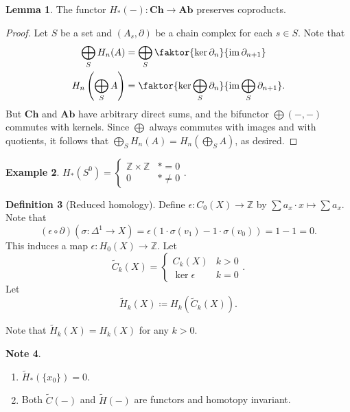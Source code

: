 \documentclass[10pt,letterpaper,cm]{nupset}
\theoremstyle{definition}
\newtheorem{definition}{Definition}[subsection]
\newtheorem{exmp}[definition]{Example}
\newtheorem{note}[definition]{Note}
\theoremstyle{theorem}
\newtheorem{lemma}[definition]{Lemma}
\theoremstyle{remark}
\newcommand{\Z}{\mathbb Z}
\newcommand{\1}{\mathbb{1}}
\newcommand{\0}{\vec 0}
\DeclareMathOperator{\im}{im}
\begin{document}
\begin{lemma}
The functor $H_{\ast}(-) : \mathbf{Ch} \to \mathbf{Ab}$ preserves coproducts. 
\end{lemma}
\begin{proof}
Let $S$ be a set and $(A_s, \partial)$ be a chain complex for each $s\in S$. Note that 
\begin{align*}
\bigoplus_S H_n(A) &= \bigoplus_S \faktor{\ker{\partial_n}}{\im{\partial_{n+1}}}
\\ H_n\left(\bigoplus_S A\right) &= \faktor{\ker{\bigoplus_S \partial_n}}{\im{\bigoplus_S \partial_{n+1}}}.
\end{align*} But $\mathbf{Ch}$ and $\mathbf{Ab}$ have arbitrary direct sums, and the bifunctor $\bigoplus (-,-)$ commutes with kernels. Since $\bigoplus$ always commutes with images and with quotients, it follows that $\bigoplus_S H_n(A) = H_n\left(\bigoplus_S A\right)$, as desired. 
\end{proof}


\begin{exmp}
$H_{\ast}(S^0) = \begin{cases} \Z \times \Z & \ast = 0 \\ 0 & \ast \ne 0 \end{cases}.$
\end{exmp}

\begin{definition}[Reduced homology]
Define $\epsilon :C_0(X) \to \Z$ by ${\sum {a_x \cdot x}} \mapsto \sum a_x$. Note that $$(\epsilon \circ \partial)(\sigma : \Delta^1 \to X) = \epsilon(1 \cdot \sigma(v_1) - 1 \cdot \sigma(v_0)) = 1-1 =0.$$ This induces a map $\epsilon : H_0(X) \to \Z$. Let $$\widetilde{C}_k(X) = \begin{cases} C_k(X) & k >0 \\ \ker{\epsilon} & k =0 \end{cases}.$$ Let $$\widetilde{H}_k(X) \coloneqq H_k\left(\widetilde{C}_k(X)\right).$$ 
\end{definition}

Note that $\widetilde{H}_k(X) = H_k(X)$ for any $k>0$.

\begin{note} $ $
\begin{enumerate}
\item $\widetilde{H}_{\ast}(\{x_0\}) =0$.
\item Both $\widetilde{C}(-)$ and $\widetilde{H}(-)$ are functors and homotopy invariant.
\end{enumerate}
\end{note}
\end{document}
